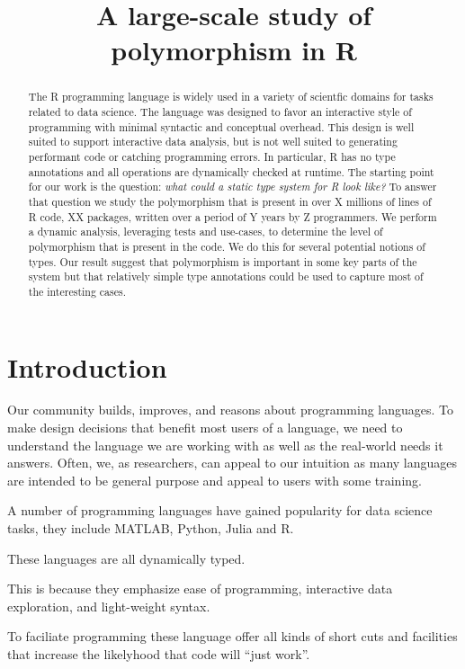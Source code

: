 \documentclass[acmsmall,10pt,review,anonymous]{acmart}\settopmatter{printfolios=true,printccs=false,printacmref=false}
\begin{document}
\title{A large-scale study of polymorphism in R}

\begin{abstract}
The R programming language is widely used in a variety of scientfic domains
for tasks related to data science. The language was designed to favor an
interactive style of programming with minimal syntactic and conceptual
overhead. This design is well suited to support interactive data analysis,
but is not well suited to generating performant code or catching programming
errors.  In particular, R has no type annotations and all operations are
dynamically checked at runtime. The starting point for our work is the
question: \emph{what could a static type system for R look like?}  To answer
that question we study the polymorphism that is present in over X millions
of lines of R code, XX packages, written over a period of Y years by Z
programmers.  We perform a dynamic analysis, leveraging tests and use-cases,
to determine the level of polymorphism that is present in the code. We do
this for several potential notions of types. Our result suggest that
polymorphism is important in some key parts of the system but that
relatively simple type annotations could be used to capture most of the
interesting cases.
\end{abstract}
\maketitle

\section{Introduction}

Our community builds, improves, and reasons about programming languages.  To
make design decisions that benefit most users of a language, we need to
understand the language we are working with as well as the real-world needs
it answers. Often, we, as researchers, can appeal to our intuition as many
languages are intended to be general purpose and appeal to users with some 
training.

A number of programming languages have gained popularity for data science
tasks, they include MATLAB, Python, Julia and R.

These languages are all dynamically typed.

This is because they emphasize ease of programming, interactive data
exploration, and light-weight syntax.

To faciliate programming these language offer all kinds of short cuts and
facilities that increase the likelyhood that code will ``just work''.
\end{document}
